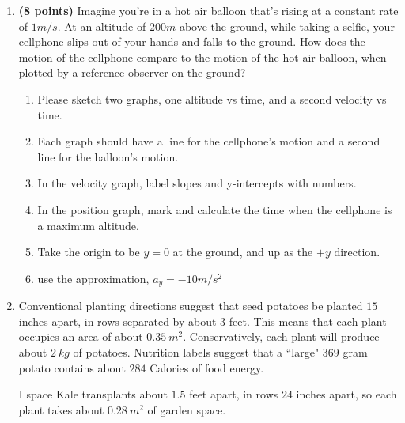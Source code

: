 \documentclass[10pt]{article}
\begin{document}
\begin{enumerate}
%
\newpage
\item \textbf{(8 points)} Imagine you're in a hot air balloon that's rising at a constant rate of $1m/s$.  At an altitude of $200m$ above the ground, while taking a selfie, your cellphone slips out of your hands and falls to the ground.  How does the motion of the cellphone compare to the motion of the hot air balloon, when plotted by a reference observer on the ground?  
\begin{enumerate}
\item Please sketch two graphs, one altitude vs time, and a second velocity vs time.  
\item Each graph should have a line for the cellphone's motion and a second line for the balloon's motion.  
\item In the velocity graph, label slopes and y-intercepts with numbers.  
\item In the position graph, mark and calculate the time when the cellphone is a maximum altitude.  
\item Take the origin to be $y=0$ at the ground,  and up as the $+y$ direction.
\item use the approximation, $a_y=-10m/s^2$
\end{enumerate}
\newpage


\item
Conventional planting directions suggest that seed potatoes be planted $15$ inches apart, in rows separated by about $3$ feet.  This means that each plant occupies an area of about $0.35~m^2$.  Conservatively, each plant will produce about $2~kg$ of potatoes.  Nutrition labels suggest that a ``large" $369$ gram potato contains about $284$ Calories of food energy.  

I space Kale transplants about $1.5$ feet apart, in rows $24$ inches apart, so each plant takes about $0.28~m^2$ of garden space.  


\end{enumerate}
\end{document}
